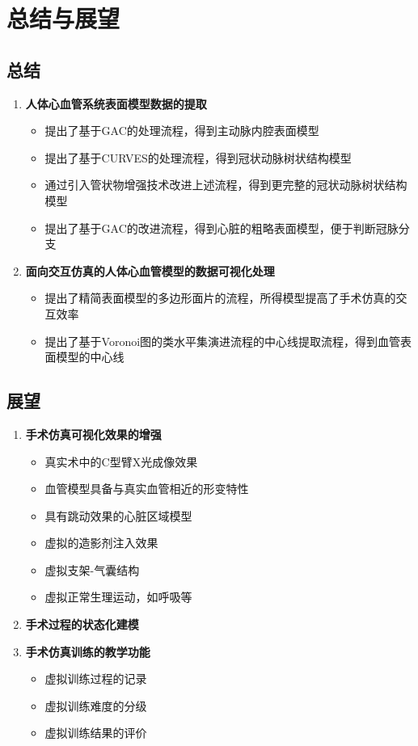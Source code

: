 \section{总结与展望}

\subsection{总结}
\begin{frame}
\begin{enumerate}
\item \textbf{人体心血管系统表面模型数据的提取}
\begin{itemize}
\pause \item 提出了基于GAC的处理流程，得到主动脉内腔表面模型
\pause \item 提出了基于CURVES的处理流程，得到冠状动脉树状结构模型
\pause \item 通过引入管状物增强技术改进上述流程，得到更完整的冠状动脉树状结构模型
\pause \item 提出了基于GAC的改进流程，得到心脏的粗略表面模型，便于判断冠脉分支
\end{itemize}
\pause \item \textbf{面向交互仿真的人体心血管模型的数据可视化处理}
\begin{itemize}
\pause \item 提出了精简表面模型的多边形面片的流程，所得模型提高了手术仿真的交互效率
\pause \item 提出了基于Voronoi图的类水平集演进流程的中心线提取流程，得到血管表面模型的中心线
\end{itemize}
\end{enumerate}
\end{frame}

\subsection{展望}
\begin{frame}
\begin{enumerate}
\item \textbf{手术仿真可视化效果的增强}
\begin{itemize}
\item 真实术中的C型臂X光成像效果
\item 血管模型具备与真实血管相近的形变特性
\item 具有跳动效果的心脏区域模型
\item 虚拟的造影剂注入效果
\item 虚拟支架-气囊结构
\item 虚拟正常生理运动，如呼吸等
\end{itemize}
\pause \item \textbf{手术过程的状态化建模}
\pause \item \textbf{手术仿真训练的教学功能}
\begin{itemize}
\item 虚拟训练过程的记录
\item 虚拟训练难度的分级
\item 虚拟训练结果的评价
\end{itemize}
\end{enumerate}
\end{frame}




